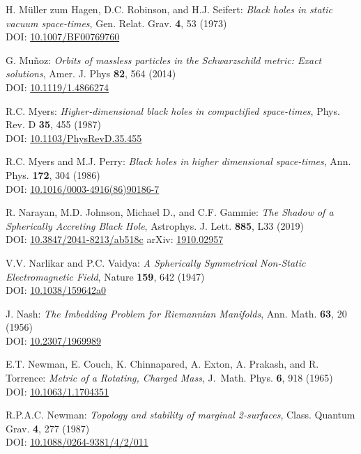 \begin{thebibliography}{123}
H. Müller zum Hagen, D.C. Robinson, and H.J. Seifert:
{\em Black holes in static vacuum space-times},
Gen. Relat. Grav. {\bf 4}, 53 (1973)\\
DOI: \href{https://doi.org/10.1007/BF00769760}{10.1007/BF00769760}

G. Mu\~noz:
{\em Orbits of massless particles in the Schwarzschild metric: Exact solutions},
Amer. J. Phys {\bf 82}, 564 (2014)\\
DOI: \href{https://doi.org/10.1119/1.4866274}{10.1119/1.4866274}

R.C. Myers:
{\em Higher-dimensional black holes in compactified space-times},
Phys. Rev. D {\bf 35}, 455 (1987)\\
DOI: \href{https://doi.org/10.1103/PhysRevD.35.455}{10.1103/PhysRevD.35.455}

R.C. Myers and M.J. Perry:
{\em Black holes in higher dimensional space-times},
Ann. Phys. {\bf 172}, 304 (1986)\\
DOI: \href{https://doi.org/10.1016/0003-4916(86)90186-7}{10.1016/0003-4916(86)90186-7}

R. Narayan, M.D. Johnson, Michael D., and C.F. Gammie:
{\em The Shadow of a Spherically Accreting Black Hole},
Astrophys. J. Lett. {\bf 885}, L33 (2019)\\
DOI: \href{https://doi.org/10.3847/2041-8213/ab518c}{10.3847/2041-8213/ab518c}\hfill
arXiv: \href{https://arxiv.org/abs/1910.02957}{1910.02957}

V.V. Narlikar and P.C. Vaidya:
{\em A Spherically Symmetrical Non-Static Electromagnetic Field},
Nature {\bf 159}, 642 (1947) \\
DOI: \href{https://doi.org/10.1038/159642a0}{10.1038/159642a0}

J. Nash:
{\em The Imbedding Problem for Riemannian Manifolds},
Ann. Math. {\bf 63}, 20 (1956)\\
DOI: \href{https://doi.org/10.2307/1969989}{10.2307/1969989}

E.T. Newman, E. Couch, K. Chinnapared, A. Exton, A. Prakash, and R. Torrence:
{\em Metric of a Rotating, Charged Mass},
J.~Math. Phys. {\bf 6}, 918 (1965)\\
DOI: \href{https://doi.org/10.1063/1.1704351}{10.1063/1.1704351}

R.P.A.C. Newman:
{\em Topology and stability of marginal 2-surfaces},
Class. Quantum Grav. {\bf 4}, 277 (1987)\\
DOI: \href{https://doi.org/10.1088/0264-9381/4/2/011}{10.1088/0264-9381/4/2/011}


\end{thebibliography}
